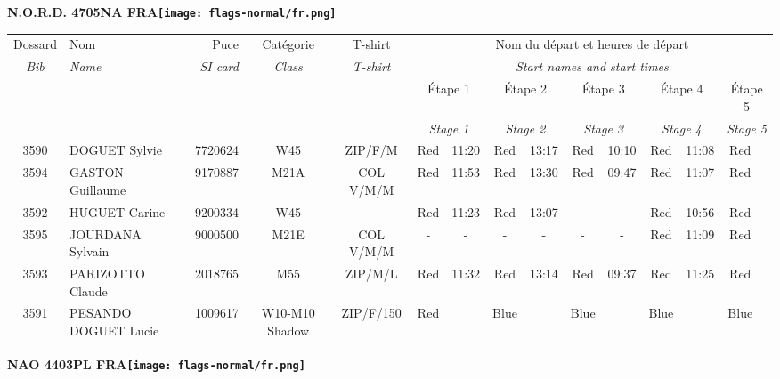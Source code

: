 \documentclass{report}
\begin{document}
\newpage
  \Huge \centering \bfseries N.O.R.D. 4705NA FRA\normalfont \footnotesize \sffamily \hfill \texttt{[image: flags-normal/fr.png]} \newline 
  \begin{longtable}{|c|l|r|c|c|*{5}{cc|}}
    Dossard & Nom  & Puce    & Catégorie & T-shirt & \multicolumn{10}{c|}{Nom du départ et heures de départ} \\
    \itshape Bib     & \itshape Name & \itshape SI card & \itshape Class  & \itshape  T-shirt  & \multicolumn{10}{c|}{\itshape Start names and start times} \\
    \hline
    & & & & & \multicolumn{2}{c|}{Étape 1} & \multicolumn{2}{c|}{Étape 2} & \multicolumn{2}{c|}{Étape 3} & \multicolumn{2}{c|}{Étape 4} & \multicolumn{2}{c|}{Étape 5} \\
    & & & & & \multicolumn{2}{c|}{\itshape Stage 1} & \multicolumn{2}{c|}{\itshape Stage 2} & \multicolumn{2}{c|}{\itshape Stage 3} & \multicolumn{2}{c|}{\itshape Stage 4} & \multicolumn{2}{c|}{\itshape Stage 5} \\
    \hline
    3590 & DOGUET Sylvie & 7720624 & W45 & ZIP/F/M & Red & 11:20 & Red & 13:17 & Red & 10:10 & Red & 11:08 & Red &  \\
    3594 & GASTON Guillaume & 9170887 & M21A & COL V/M/M & Red & 11:53 & Red & 13:30 & Red & 09:47 & Red & 11:07 & Red &  \\
    3592 & HUGUET Carine & 9200334 & W45 &   & Red & 11:23 & Red & 13:07 & - &  - & Red & 10:56 & Red &  \\
    3595 & JOURDANA Sylvain & 9000500 & M21E & COL V/M/M & - &  - & - &  - & - &  - & Red & 11:09 & Red &  \\
    3593 & PARIZOTTO Claude & 2018765 & M55 & ZIP/M/L & Red & 11:32 & Red & 13:14 & Red & 09:37 & Red & 11:25 & Red &  \\
    3591 & PESANDO DOGUET Lucie & 1009617 & W10-M10 Shadow & ZIP/F/150 & Red &   & Blue &   & Blue &   & Blue &   & Blue &  \\
  \end{longtable}
\newpage
  \Huge \centering \bfseries NAO 4403PL FRA\normalfont \footnotesize \sffamily \hfill \texttt{[image: flags-normal/fr.png]} \newline 
\end{document}

